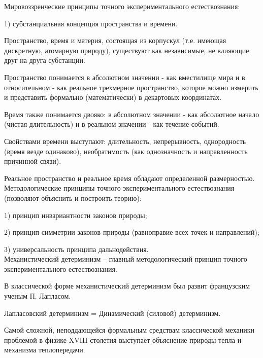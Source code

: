 \documentclass[exam_answers.tex]{subfiles}
\begin{document}
\renewcommand{\baselinestretch}{\blch}

Мировоззренческие принципы точного экспериментального естествознания:

1) субстанциальная концепция пространства и времени.

Пространство, время и материя, состоящая из корпускул (т.е. имеющая
дискретную, атомарную природу), существуют как независимые, не влияющие
друг на друга субстанции.

Пространство понимается в абсолютном значении - как вместилище мира и в
относительном - как реальное трехмерное пространство, которое можно
измерить и представить формально (математически) в декартовых
координатах.

Время также понимается двояко: в абсолютном значении - как абсолютное
начало (чистая длительность) и в реальном значении - как течение событий.

Свойствами времени выступают: длительность, непрерывность, однородность
(время везде одинаково), необратимость (как однозначность и направленность
причинной связи).

Реальное пространство и реальное время обладают определенной
размерностью.
\\

Методологические принципы точного экспериментального естествознания (позволяют объяснить и построить теорию):

1) принцип инвариантности законов природы;

2) принцип симметрии законов природы (равноправие всех точек и направлений);

3) универсальность принципа дальнодействия.
\\

Механистический детерминизм -- главный методологический принцип точного
экспериментального естествознания.

В классической форме механистический детерминизм был развит
французским ученым П. Лапласом.

Лапласовский детерминизм = Динамический (силовой) детерминизм.

Самой сложной, неподдающейся формальным средствам классической
механики проблемой в физике XVIII столетия выступает объяснение
природы тепла и механизма теплопередачи.
\end{document}
